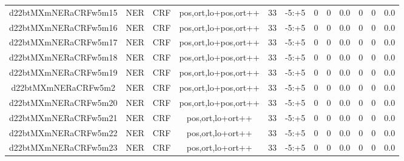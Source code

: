 \documentclass[a4paper]{article}
\begin{document}
\begin{landscape}
\begin{center}
\begin{tabular}{ |c|c|c|c|c|c|c|c|c|c|c|c|}
 
 	
 	\small{ d22btMXmNERaCRFw5m15 } & \small{ NER} & \small{  CRF }  & pos,ort,lo+pos,ort++  &  33 &  \small{  -5:+5 }  &  0 & 0 & 0.0  &  0 & 0 & 0.0 \\
 	

 
 	
 	\small{ d22btMXmNERaCRFw5m16 } & \small{ NER} & \small{  CRF }  & pos,ort,lo+pos,ort++  &  33 &  \small{  -5:+5 }  &  0 & 0 & 0.0  &  0 & 0 & 0.0 \\
 	

 
 	
 	\small{ d22btMXmNERaCRFw5m17 } & \small{ NER} & \small{  CRF }  & pos,ort,lo+pos,ort++  &  33 &  \small{  -5:+5 }  &  0 & 0 & 0.0  &  0 & 0 & 0.0 \\
 	

 
 	
 	\small{ d22btMXmNERaCRFw5m18 } & \small{ NER} & \small{  CRF }  & pos,ort,lo+pos,ort++  &  33 &  \small{  -5:+5 }  &  0 & 0 & 0.0  &  0 & 0 & 0.0 \\
 	

 
 	
 	\small{ d22btMXmNERaCRFw5m19 } & \small{ NER} & \small{  CRF }  & pos,ort,lo+pos,ort++  &  33 &  \small{  -5:+5 }  &  0 & 0 & 0.0  &  0 & 0 & 0.0 \\
 	

 
 	
 	\small{ d22btMXmNERaCRFw5m2 } & \small{ NER} & \small{  CRF }  & pos,ort,lo+pos,ort++  &  33 &  \small{  -5:+5 }  &  0 & 0 & 0.0  &  0 & 0 & 0.0 \\
 	

 
 	
 	\small{ d22btMXmNERaCRFw5m20 } & \small{ NER} & \small{  CRF }  & pos,ort,lo+pos,ort++  &  33 &  \small{  -5:+5 }  &  0 & 0 & 0.0  &  0 & 0 & 0.0 \\
 	

 
 	
 	\small{ d22btMXmNERaCRFw5m21 } & \small{ NER} & \small{  CRF }  & pos,ort,lo+ort++  &  33 &  \small{  -5:+5 }  &  0 & 0 & 0.0  &  0 & 0 & 0.0 \\
 	

 
 	
 	\small{ d22btMXmNERaCRFw5m22 } & \small{ NER} & \small{  CRF }  & pos,ort,lo+ort++  &  33 &  \small{  -5:+5 }  &  0 & 0 & 0.0  &  0 & 0 & 0.0 \\
 	

 
 	
 	\small{ d22btMXmNERaCRFw5m23 } & \small{ NER} & \small{  CRF }  & pos,ort,lo+ort++  &  33 &  \small{  -5:+5 }  &  0 & 0 & 0.0  &  0 & 0 & 0.0 \\
 	


\end{tabular}
\end{center}
\end{landscape}
\end{document}
